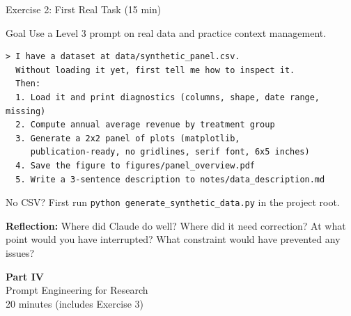 \documentclass[aspectratio=169,10pt]{beamer}
\begin{document}
\begin{frame}[fragile]{Exercise 2: First Real Task {\small(15 min)}}
\begin{exampleblock}{Goal}
Use a Level 3 prompt on real data and practice context management.
\end{exampleblock}

\begin{lstlisting}[style=prompt, basicstyle=\scriptsize\ttfamily]
> I have a dataset at data/synthetic_panel.csv.
  Without loading it yet, first tell me how to inspect it.
  Then:
  1. Load it and print diagnostics (columns, shape, date range, missing)
  2. Compute annual average revenue by treatment group
  3. Generate a 2x2 panel of plots (matplotlib,
     publication-ready, no gridlines, serif font, 6x5 inches)
  4. Save the figure to figures/panel_overview.pdf
  5. Write a 3-sentence description to notes/data_description.md
\end{lstlisting}

\vspace{0.2em}
{\small No CSV? First run \texttt{python generate\_synthetic\_data.py} in the project root.}

\vspace{0.2em}
\textbf{Reflection:} Where did Claude do well? Where did it need correction? At what point would you have interrupted? What constraint would have prevented any issues?
\end{frame}


\begin{frame}{}
\vfill
\begin{center}
{\Huge \textcolor{uzhblue}{\textbf{Part IV}}}\\[12pt]
{\LARGE Prompt Engineering for Research}\\[6pt]
{\small 20 minutes (includes Exercise 3)}
\end{center}
\vfill
\end{frame}
\end{document}

